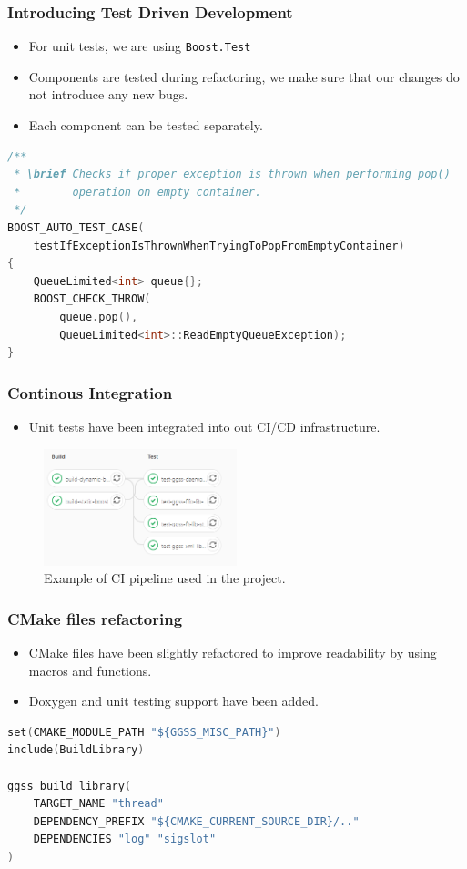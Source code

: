\documentclass[10pt]{beamer}
\begin{document}
\begin{frame}[fragile]
\frametitle{Introducing Test Driven Development}
\begin{itemize}
\item For unit tests, we are using \lstinline[basicstyle=\ttfamily\normalsize]{Boost.Test}
\item Components are tested during refactoring, we make sure that our changes do not introduce any new bugs.
\item Each component can be tested separately.
\end{itemize}
\begin{lstlisting}[language=c++, caption={Unit test example}]
/**
 * \brief Checks if proper exception is thrown when performing pop() 
 *        operation on empty container.
 */
BOOST_AUTO_TEST_CASE(
    testIfExceptionIsThrownWhenTryingToPopFromEmptyContainer)
{
    QueueLimited<int> queue{};
    BOOST_CHECK_THROW(
        queue.pop(), 
        QueueLimited<int>::ReadEmptyQueueException);
}   
\end{lstlisting}
\end{frame}

\begin{frame}[fragile]
\frametitle{Continous Integration}
\begin{itemize}
\item Unit tests have been integrated into out CI/CD infrastructure.
\end{itemize}
\begin{figure}
\centering
\includegraphics[width=0.5\textwidth]{resources/pipeline_example.png}
\caption{Example of CI pipeline used in the project.}
\end{figure}
\end{frame}


\begin{frame}[fragile]
\frametitle{CMake files refactoring}
\begin{itemize}
\item CMake files have been slightly refactored to improve readability by using macros and functions.
\item Doxygen and unit testing support have been added.
\end{itemize}
\begin{lstlisting}[language=c++, caption={New version of CMake used for building \emph{thread-lib}}]
set(CMAKE_MODULE_PATH "${GGSS_MISC_PATH}")
include(BuildLibrary)

ggss_build_library(
    TARGET_NAME "thread"
    DEPENDENCY_PREFIX "${CMAKE_CURRENT_SOURCE_DIR}/.."
    DEPENDENCIES "log" "sigslot"
)
\end{lstlisting}
\end{frame}
\end{document}
